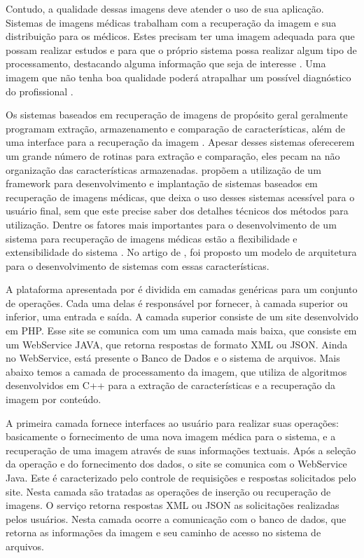 Contudo, a qualidade dessas imagens deve atender o uso de sua aplicação.
Sistemas de imagens médicas trabalham com a recuperação da imagem e sua distribuição para os médicos.
Estes precisam ter uma imagem adequada para que possam realizar estudos e para que o próprio sistema possa realizar algum tipo de processamento, destacando alguma informação que seja de interesse \cite{REF12}.
Uma imagem que não tenha boa qualidade poderá atrapalhar um possível diagnóstico do profissional \cite{REF07} \cite{REF15}.

Os sistemas baseados em recuperação de imagens de propósito geral geralmente programam extração, armazenamento e comparação de características, além de uma interface para a recuperação da imagem \cite{REF18}.
Apesar desses sistemas oferecerem um grande número de rotinas para extração e comparação, eles pecam na não organização das características armazenadas.
\cite{REF10} propõem a utilização de um framework para desenvolvimento e implantação de sistemas baseados em recuperação de imagens médicas, que deixa o uso desses sistemas acessível para o usuário final, sem que este precise saber dos detalhes técnicos dos métodos para utilização.
Dentre os fatores mais importantes para o desenvolvimento de um sistema para recuperação de imagens médicas estão a flexibilidade e extensibilidade do sistema \cite{REF18}.
No artigo de \cite{REF10}, foi proposto um modelo de arquitetura para o desenvolvimento de sistemas com essas características.

A plataforma apresentada por \cite{REF18} é dividida em camadas genéricas para um conjunto de operações.
Cada uma delas é responsável por fornecer, à camada superior ou inferior, uma entrada e saída.
A camada superior consiste de um site desenvolvido em PHP.
Esse site se comunica com um uma camada mais baixa, que consiste em um WebService JAVA, que retorna respostas de formato XML ou JSON.
Ainda no WebService, está presente o Banco de Dados e o sistema de arquivos.
Mais abaixo temos a camada de processamento da imagem, que utiliza de algoritmos desenvolvidos em C++ para a extração de características e a recuperação da imagem por conteúdo.

A primeira camada fornece interfaces ao usuário para realizar suas operações: basicamente o fornecimento de uma nova imagem médica para o sistema, e a recuperação de uma imagem através de suas informações textuais.
Após a seleção da operação e do fornecimento dos dados, o site se comunica com o WebService Java. Este é caracterizado pelo controle de requisições e respostas solicitados pelo site.
Nesta camada são tratadas as operações de inserção ou recuperação de imagens.
O serviço retorna respostas XML ou JSON as solicitações realizadas pelos usuários.
Nesta camada ocorre a comunicação com o banco de dados, que retorna as informações da imagem e seu caminho de acesso no sistema de arquivos.


